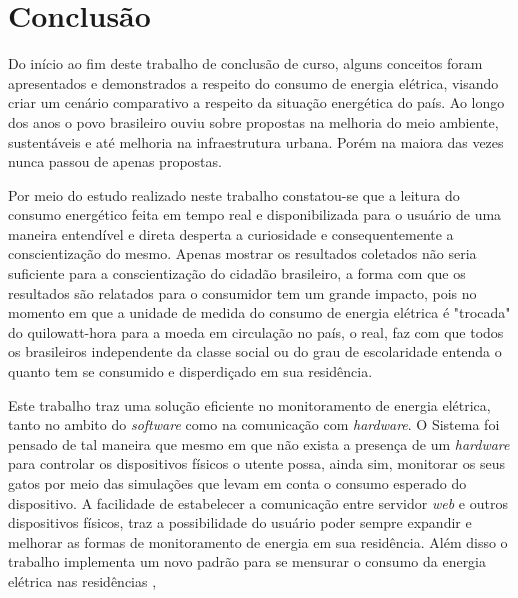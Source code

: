 \chapter[Conclusão]{Conclusão}
\label{ch:conclusao-cap}

Do início ao fim deste trabalho de conclusão de curso, alguns conceitos foram apresentados
e demonstrados a respeito do consumo de energia elétrica, visando criar um cenário
comparativo a respeito da situação energética do país. Ao longo dos anos o povo brasileiro
ouviu sobre propostas na melhoria do meio ambiente, sustentáveis e até
melhoria na infraestrutura urbana. Porém na maiora das vezes nunca passou de apenas propostas.

Por meio do estudo realizado neste trabalho constatou-se que a leitura do
consumo energético feita em tempo real e disponibilizada para o usuário de uma maneira entendível e direta
desperta a curiosidade e consequentemente a conscientização do mesmo. Apenas mostrar os resultados coletados não seria suficiente
para a conscientização do cidadão brasileiro, a forma com que os resultados são relatados para o consumidor tem um grande impacto, pois
no momento em que a unidade de medida do consumo de energia elétrica é "trocada" do quilowatt-hora para a moeda em circulação no país, o real, 
faz com que todos os brasileiros independente da classe social ou do grau de escolaridade entenda o quanto tem se consumido e disperdiçado em sua residência.

Este trabalho traz uma solução eficiente no monitoramento de energia elétrica, tanto no ambito do \textit{software} como na comunicação com 
\textit{hardware}. O Sistema foi pensado de tal maneira que mesmo em que não exista a presença de um \textit{hardware} para controlar os dispositivos físicos
o utente possa, ainda sim, monitorar os seus gatos por meio das simulações que levam em conta o consumo esperado do dispositivo. A facilidade de estabelecer 
a comunicação entre servidor \textit{web} e outros dispositivos físicos, traz a possibilidade do usuário poder sempre expandir e melhorar as formas
de monitoramento de energia em sua residência. Além disso o trabalho implementa um novo padrão para se mensurar o consumo da energia elétrica nas
residências ,  

